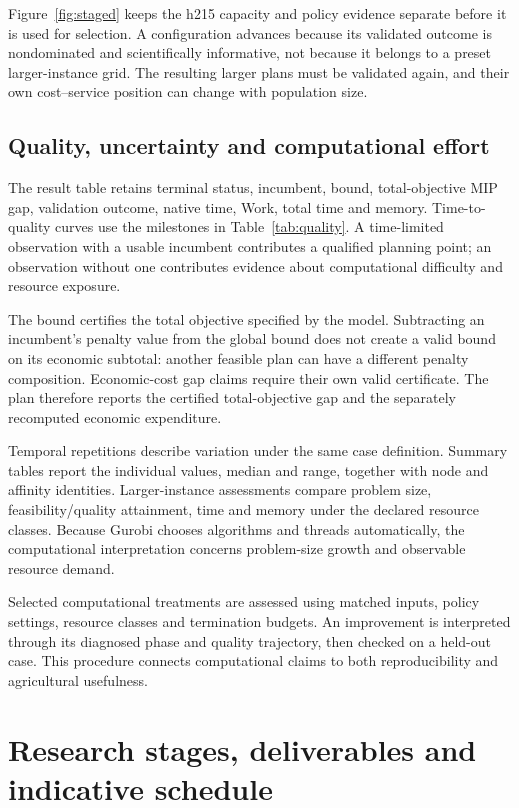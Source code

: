 \documentclass[11pt,a4paper]{article}
\begin{document}
Figure~\ref{fig:staged} keeps the h215 capacity and policy evidence separate before it is used for selection. A configuration advances because its validated outcome is nondominated and scientifically informative, not because it belongs to a preset larger-instance grid. The resulting larger plans must be validated again, and their own cost--service position can change with population size.

\subsection{Quality, uncertainty and computational effort}

The result table retains terminal status, incumbent, bound, total-objective MIP gap, validation outcome, native time, Work, total time and memory. Time-to-quality curves use the milestones in Table~\ref{tab:quality}. A time-limited observation with a usable incumbent contributes a qualified planning point; an observation without one contributes evidence about computational difficulty and resource exposure.

The bound certifies the total objective specified by the model. Subtracting an incumbent's penalty value from the global bound does not create a valid bound on its economic subtotal: another feasible plan can have a different penalty composition. Economic-cost gap claims require their own valid certificate. The plan therefore reports the certified total-objective gap and the separately recomputed economic expenditure.

Temporal repetitions describe variation under the same case definition. Summary tables report the individual values, median and range, together with node and affinity identities. Larger-instance assessments compare problem size, feasibility/quality attainment, time and memory under the declared resource classes. Because Gurobi chooses algorithms and threads automatically, the computational interpretation concerns problem-size growth and observable resource demand.

Selected computational treatments are assessed using matched inputs, policy settings, resource classes and termination budgets. An improvement is interpreted through its diagnosed phase and quality trajectory, then checked on a held-out case. This procedure connects computational claims to both reproducibility and agricultural usefulness.

\section{Research stages, deliverables and indicative schedule}
\label{sec:stages}
\end{document}
